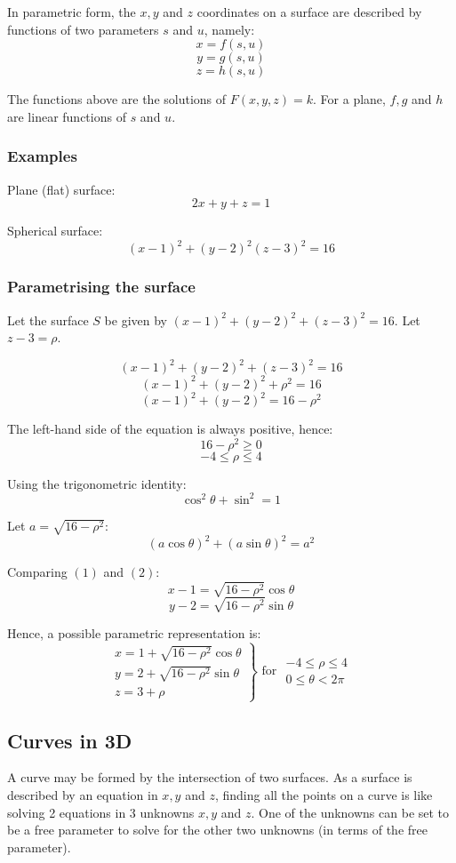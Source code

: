 \documentclass[11pt]{article}
\begin{document}
In parametric form, the \(x, y\) and \(z\) coordinates on a surface are described by functions of two parameters \(s\) and \(u\), namely:
\[x = f(s, u)\]
\[y = g(s, u)\]
\[z = h(s, u)\]

The functions above are the solutions of \(F(x, y, z) = k\). For a plane, \(f, g\) and \(h\) are linear functions of \(s\) and \(u\).

\subsubsection{Examples}
\label{sec:org94f23e0}
Plane (flat) surface:
\[2x + y + z = 1\]

Spherical surface:
\[(x - 1)^2 + (y - 2)^2 (z - 3)^2 = 16\]

\subsubsection{Parametrising the surface}
\label{sec:org3ac4fc0}
Let the surface \(S\) be given by \((x - 1)^2 + (y - 2)^2 + (z - 3)^2 = 16\). Let \(z - 3 = \rho\).

\[(x - 1)^2 + (y - 2)^2 + (z - 3)^2 = 16\]
\[(x - 1)^2 + (y - 2)^2 + \rho^2 = 16\]
\[(x - 1)^2 + (y - 2)^2 = 16 - \rho^2 \tag{1}\]

The left-hand side of the equation is always positive, hence:
\[16 - \rho^2 \ge 0\]
\[-4 \le \rho \le 4\]

Using the trigonometric identity:
\[\cos^2 \theta + \sin^2 = 1\]

Let \(a = \sqrt{16 - \rho^2}\):
\[(a \cos \theta)^2 + (a \sin \theta)^2 = a^2 \tag{2}\]

Comparing \((1)\) and \((2)\):
\[x - 1 = \sqrt{16 - \rho^2} \cos \theta\]
\[y - 2 = \sqrt{16 - \rho^2} \sin \theta\]

Hence, a possible parametric representation is:
\begin{displaymath}
\left. \begin{array}{l}
x = 1 + \sqrt{16 - \rho^2} \cos \theta \\
y = 2 + \sqrt{16 - \rho^2} \sin \theta \\
z = 3 + \rho
\end{array} \right\} \text{ for } \begin{array}{c}
-4 \le \rho \le 4 \\
0 \le \theta < 2 \pi
\end{array}
\end{displaymath}

\subsection{Curves in 3D}
\label{sec:orga2c2f87}
A curve may be formed by the intersection of two surfaces.
As a surface is described by an equation in \(x, y\) and \(z\), finding all the points on a curve is like solving 2 equations in 3 unknowns \(x, y\) and \(z\).
One of the unknowns can be set to be a free parameter to solve for the other two unknowns (in terms of the free parameter).
\end{document}

